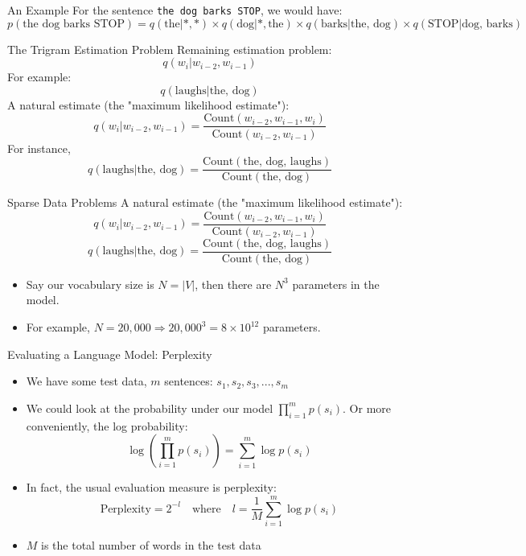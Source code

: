 \documentclass[handout]{beamer}
\begin{document}
\begin{frame}{An Example}
    \scriptsize
    For the sentence \texttt{the dog barks STOP}, we would have:
    \[
        p(\text{the dog barks STOP}) = q(\text{the}|*, *) \times q(\text{dog}|*, \text{the}) \times q(\text{barks}|\text{the, dog}) \times q(\text{STOP}|\text{dog, barks})
    \]
\end{frame}

\begin{frame}{The Trigram Estimation Problem}
    \scriptsize
    Remaining estimation problem:
    \[
        q(w_i | w_{i-2}, w_{i-1})
    \]
    For example:
    \[
        q(\text{laughs} | \text{the, dog})
    \]
    A natural estimate (the "maximum likelihood estimate"):
    \[
        q(w_i | w_{i-2}, w_{i-1}) = \frac{{\text{Count}(w_{i-2}, w_{i-1}, w_i)}}{{\text{Count}(w_{i-2}, w_{i-1})}}
    \]
    For instance,
    \[
        q(\text{laughs} | \text{the, dog}) = \frac{{\text{Count}(\text{the, dog, laughs})}}{{\text{Count}(\text{the, dog})}}
    \]
\end{frame}

\begin{frame}{Sparse Data Problems}
    \scriptsize
    A natural estimate (the "maximum likelihood estimate"):
    \[
        q(w_i | w_{i-2}, w_{i-1}) = \frac{{\text{Count}(w_{i-2}, w_{i-1}, w_i)}}{{\text{Count}(w_{i-2}, w_{i-1})}}
    \]
    \[
        q(\text{laughs} | \text{the, dog}) = \frac{{\text{Count}(\text{the, dog, laughs})}}{{\text{Count}(\text{the, dog})}}
    \]
    \begin{itemize}
     \item     Say our vocabulary size is $N = |V|$, then there are $N^3$ parameters in the model.
     \item     For example, $N = 20,000 \Rightarrow 20,000^3 = 8 \times 10^{12}$ parameters.
    \end{itemize}


\end{frame}

\begin{frame}{Evaluating a Language Model: Perplexity}
    \scriptsize
    \begin{itemize}
        \item We have some test data, $m$ sentences: $s_1, s_2, s_3, ..., s_m$
        \item We could look at the probability under our model $\prod_{i=1}^{m} p(s_i)$. Or more conveniently, the log probability:
        \[
            \log \left( \prod_{i=1}^{m} p(s_i) \right) = \sum_{i=1}^{m} \log p(s_i)
        \]
        \item In fact, the usual evaluation measure is perplexity:
        \[
            \text{Perplexity} = 2^{-l} \quad \text{where} \quad l = \frac{1}{M} \sum_{i=1}^{m} \log p(s_i)
        \]
        \item $M$ is the total number of words in the test data
    \end{itemize}
\end{frame}
\end{document}
